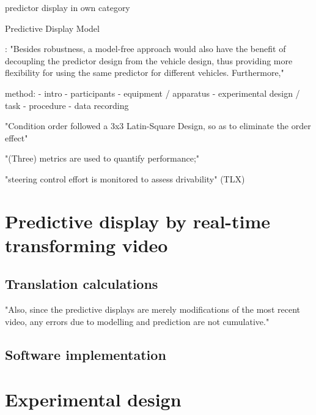 predictor display in own category
 
Predictive Display Model

\citep{Zheng2016}:
 "Besides robustness, a model-free approach would also have the benefit of decoupling the predictor design from the vehicle design, thus providing more flexibility for using the same predictor for different vehicles. Furthermore,"

method:
- intro
- participants
- equipment / apparatus
- experimental design / task
- procedure
- data recording

\citep{Lu2018} "Condition order followed a 3x3 Latin-Square Design, so as to eliminate the order effect"

"(Three) metrics are used to quantify performance;"

"steering control effort is monitored to assess drivability" (TLX)

\section{Predictive display by real-time transforming video}
    \subsection{Translation calculations}
    
    \citep{Matheson2013} "Also, since the predictive displays are merely modifications of the most recent video, any errors due to modelling and prediction are not cumulative."
    
    \subsection{Software implementation}

\section{Experimental design}
